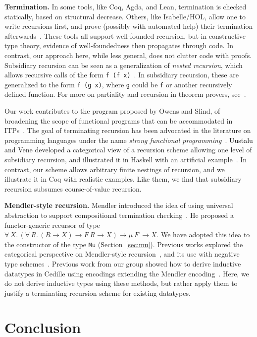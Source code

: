 \documentclass[a4paper,USenglish]{lipics-v2021}
\newcommand{\all}[2]{\forall\, #1.\, #2}
\begin{document}
\textbf{Termination.}  In some tools, like Coq, Agda, and Lean,
termination is checked statically, based on structural decrease.
Others, like Isabelle/HOL, allow one to write recursions first, and
prove (possibly with automated help) their termination
afterwards~\cite{krauss}.  These tools all support well-founded
recursion, but in constructive type theory, evidence of
well-foundedness then propagates through code.  In contrast, our
approach here, while less general, does not clutter code with proofs.
Subsidiary recursion can be seen as a generalization of \emph{nested
recursion}, which allows recursive calls of the form
\verb|f (f x)|~\cite{krauss10}.  In subsidiary recursion, these are
generalized to the form \verb|f (g x)|, where \verb|g| could be
\verb|f| or another recursively defined function.  For more on
partiality and recursion in theorem provers, see~\cite{bove+16}.

Our work contributes to the program proposed by Owens and Slind, of
broadening the scope of functional programs that can be accommodated
in ITPs~\cite{owens+08}.  The goal of terminating recursion has been
advocated in the literature on programming languages under the name
\emph{strong functional programming}~\cite{turner95}.  Uustalu and
Vene developed a categorical view of a recursion scheme allowing one
level of subsidiary recursion, and illustrated it in Haskell with an
artificial example~\cite{uustalu11}.  In contrast, our scheme allows
arbitrary finite nestings of recursion, and we illustrate it in Coq
with realistic examples.  Like them, we find that subsidiary recursion
subsumes course-of-value recursion.

\textbf{Mendler-style recursion.}  Mendler introduced the idea of using
universal abstraction to support compositional termination checking~\cite{mendler91}.  He proposed a
functor-generic recursor of type $\all{X}{(\all{R}{(R \to X) \to F\ R
    \to X}) \to \mu\ F\ \to X}$. We have adopted this idea to the
constructor of the type \verb|Mu| (Section~\ref{sec:mu}).  Previous
works explored the categorical perspective on Mendler-style
recursion~\cite{uustalu99}, and its use with negative type
schemes~\cite{ahn11}.  Previous work from our group showed
how to derive inductive datatypes in Cedille using encodings
extending the Mendler encoding~\cite{firsov+18b,firsov+18a}.
Here, we do not derive inductive types using these methods,
but rather apply them to justify a terminating recursion scheme
for existing datatypes.

\section{Conclusion}
\end{document}
